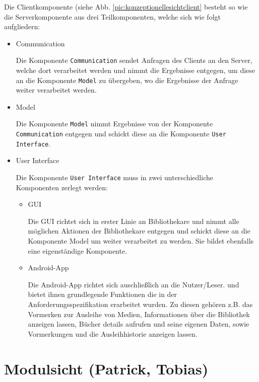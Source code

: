 \documentclass[fontsize=12pt,paper=a4,twoside]{scrartcl}
\begin{document}
Die Clientkomponente (siehe Abb. \vref{pic:konzeptionellesichtclient} besteht so wie die Serverkomponente aus drei Teilkomponenten, welche sich wie folgt aufgliedern:

\begin{itemize}
\item{Communication}

Die Komponente \texttt{Communication} sendet Anfragen des Clients an den Server, welche dort verarbeitet werden und nimmt die Ergebnisse entgegen, um diese an die Komponente \texttt{Model} zu übergeben, wo die Ergebnisse der Anfrage weiter verarbeitet werden.

\item{Model}

Die Komponente \texttt{Model} nimmt Ergebnisse von der Komponente \texttt{Communication} entgegen und schickt diese an die Komponente \texttt{User Interface}. 

\item{User Interface}

Die Komponente \texttt{User Interface} muss in zwei unterschiedliche Komponenten zerlegt werden:
\begin{itemize}
\item{GUI}

Die GUI richtet sich in erster Linie an Bibliothekare und nimmt alle möglichen Aktionen der Bibliothekare entgegen und schickt diese an die Komponente Model um weiter verarbeitet zu werden. Sie bildet ebenfalls eine eigenständige Komponente.

\item{Android-App}

Die Android-App richtet sich auschließlich an die Nutzer/Leser. und bietet ihnen grundlegende Funktionen die in der Anforderungsspezifikation erarbeitet wurden. Zu diesen gehören z.B. das Vormerken zur Ausleihe von Medien, Informationen über die Bibliothek anzeigen lassen, Bücher details aufrufen und seine eigenen Daten, sowie Vormerkungen und die Ausleihhistorie anzeigen lassen.

\end{itemize}

\end{itemize}

\newpage

\section{Modulsicht (Patrick, Tobias)}
\label{sec:modulsicht}
\end{document}
